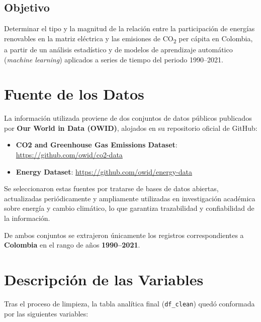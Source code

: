 \documentclass[11pt]{article}
\begin{document}
\subsection*{Objetivo}
Determinar el tipo y la magnitud de la relación entre la participación de energías renovables en la matriz eléctrica y las emisiones de CO\textsubscript{2} per cápita en Colombia, a partir de un análisis estadístico y de modelos de aprendizaje automático (\textit{machine learning}) aplicados a series de tiempo del periodo 1990--2021.

\section{Fuente de los Datos}

La información utilizada proviene de dos conjuntos de datos públicos publicados por \textbf{Our World in Data (OWID)}, alojados en su repositorio oficial de GitHub:

\begin{itemize}[leftmargin=1.2cm]
    \item \textbf{CO2 and Greenhouse Gas Emissions Dataset}: \url{https://github.com/owid/co2-data}
    \item \textbf{Energy Dataset}: \url{https://github.com/owid/energy-data}
\end{itemize}

Se seleccionaron estas fuentes por tratarse de bases de datos abiertas, actualizadas periódicamente y ampliamente utilizadas en investigación académica sobre energía y cambio climático, lo que garantiza trazabilidad y confiabilidad de la información.

De ambos conjuntos se extrajeron únicamente los registros correspondientes a \textbf{Colombia} en el rango de años \textbf{1990--2021}.

\section{Descripción de las Variables}

Tras el proceso de limpieza, la tabla analítica final (\texttt{df\_clean}) quedó conformada por las siguientes variables:
\end{document}
